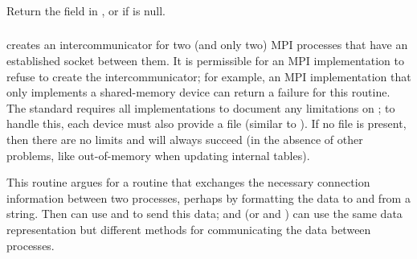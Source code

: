 \documentclass{article}
\begin{document}
\subsubsection{}
Return the  field in
, or  if
 is null.


\subsubsection{}
 creates an intercommunicator for two (and only two)
MPI processes that have an established socket between them.  It is permissible
for an MPI implementation to refuse to create the intercommunicator; for
example, an MPI implementation that only implements a shared-memory device can
return a failure for this routine.  The standard requires all implementations
to document any limitations on ; to handle this, each
device must also provide a file  (similar to
).  If no file is present, then there are no limits
and  will always succeed (in the absence of other
problems, like out-of-memory when updating internal tables).

This routine argues for a routine that exchanges the necessary connection
information between two processes, perhaps by formatting the data to and from
a string.  Then  can use  and 
to send this data;  and 
(or  and ) can use the same data
representation but different methods for communicating the data between
processes.  

\subsubsection{}
\end{document}
